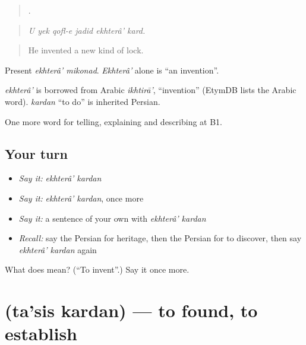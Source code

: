 \begin{quote}
     .
\end{quote}

\begin{quote}
\emph{U yek qofl-e jadid ekhterâ' kard.}
\end{quote}

\begin{quote}
He invented a new kind of lock.
\end{quote}

Present \emph{ekhterâ' mikonad}. \emph{Ekhterâ'} alone is \textquotedblleft{}an invention\textquotedblright{}.

\begin{cousinweb}
\emph{ekhterâ'} is borrowed from Arabic \emph{ikhtirā'}, \textquotedblleft{}invention\textquotedblright{} (EtymDB lists the Arabic word). \emph{kardan} \textquotedblleft{}to do\textquotedblright{} is inherited Persian.
\end{cousinweb}

\begin{grammarlens}[title={What you've built}]
One more word for telling, explaining and describing at B1.
\end{grammarlens}

\subsection*{Your turn}
\begin{itemize}
\raggedright
  \item \emph{Say it:} \emph{ekhterâ' kardan}
  \item \emph{Say it:} \emph{ekhterâ' kardan}, once more
  \item \emph{Say it:} a sentence of your own with \emph{ekhterâ' kardan}
  \item \emph{Recall:} say the Persian for heritage, then the Persian for to discover, then say \emph{ekhterâ' kardan} again
\end{itemize}

\begin{tcolorbox}[breakable,colback=teal!4,colframe=teal!35!black,title={Before you move on}]
What does   mean? (\textquotedblleft{}To invent\textquotedblright{}.) Say it once more.
\end{tcolorbox}
\section[\texorpdfstring{\fa{تاسیس} \fa{کردن} (ta'sis kardan)}{تاسیس کردن (ta'sis kardan)}]{  (ta'sis kardan) — to found, to establish}

